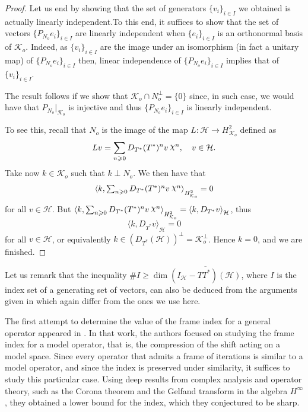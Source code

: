 \documentclass[a4paper,12pt]{amsart}
\def\HH{{\mathcal{H}}}
\def\KK{{\mathcal{K}}}
\DeclareRobustCommand{\rchi}{{\mathpalette\irchi\relax}}
\newcommand{\irchi}[2]{\raisebox{\depth}{$#1\chi$}} %
\newcommand{\scal}[1]{{\langle{#1}\rangle}}
\theoremstyle{definition}
\begin{document}
\begin{proof}
Let us end by showing that the set of generators $\{v_i\}_{i\in I}$ we obtained is actually linearly independent.To this end, it suffices to show that the set of vectors $\{P_{N_o}e_i\}_{i\in I}$ are linearly independent when $\{e_i\}_{i\in I}$ is an orthonormal basis of $\KK_o$. Indeed, as $\{v_i\}_{i\in I}$ are the image under an isomorphism (in fact a unitary map) of $\{P_{N_o}e_i\}_{i\in I}$ then, linear independence of $\{P_{N_o}e_i\}_{i\in I}$ implies that of $\{v_i\}_{i\in I}$.

The result  follows if we show that $\KK_o\cap N^\perp_o=\{0\}$ since, in such case, we would have that $P_{N_o}|_{\KK_o}$ is injective and thus $\{P_{N_o}e_i\}_{i\in I}$ is linearly independent.

To see this, recall that $N_o$ is the image of the map $L:\HH\to H^2_{\KK_o}$ defined as
\begin{equation*}
Lv=\sum_{n\geqslant0}D_{T^*}(T^*)^nv\:\rchi^n,\quad v\in\HH.
\end{equation*}
 Take now $k\in\KK_o$ such that $k\perp N_o$. We then have that
\begin{equation*}
\textstyle\scal{k,\sum_{n\geqslant0}D_{T^*}(T^*)^nv\:\rchi^n}_{H^2_{\KK_o}}=0
\end{equation*}
for all $v\in\HH$. But $\textstyle\scal{k,\sum_{n\geqslant0}D_{T^*}(T^*)^nv\:\rchi^n}_{H^2_{\KK_o}}=\scal{k,D_{T^*}v}_\HH$, thus
\begin{equation*}
\scal{k,D_{T^*}v}_\HH=0
\end{equation*}
for all $v\in\HH$, or equivalently $k\in(D_{T^*}(\HH))^\perp=\KK_o^\perp$. Hence $k=0$, and we are finished.
\end{proof}

Let us remark that the inequality $\# I\geqslant\dim\overline{(I_\HH-TT^*)(\HH)}$, where $I$ is the index set of a generating set of vectors, can also be deduced from the arguments given in \cite{CMPP20} which again differ from the ones we use here.

The first attempt to determine the value of the frame index for a general operator appeared in \cite{CMS}. In that work, the authors focused on studying the frame index for a model operator, that is, the compression of the shift acting on a model space. Since every operator that admits a frame of iterations is similar to a model operator, and since the index is preserved under similarity, it suffices to study this particular case. Using deep results from complex analysis and operator theory, such as the Corona theorem and the Gelfand transform in the algebra \(H^{\infty}\), they obtained a lower bound for the index, which they conjectured to be sharp.
\end{document}
